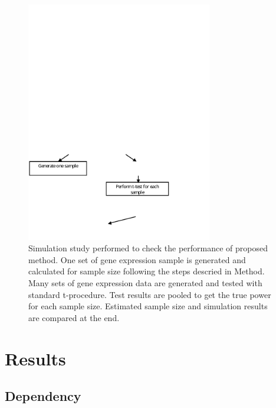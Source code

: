 \documentclass{bioinfo}
\begin{document}
\begin{figure}[h]
  \centerline{\includegraphics*[width=3.2in]{SimuFC.pdf}}
  \caption[Flow Chart for Simulation Study]
   {Simulation study performed to check the performance of proposed method.
    One set of gene expression sample is generated and calculated
    for sample size following the steps descried in Method. Many
    sets of gene expression data are generated and tested with
    standard t-procedure. Test results are pooled to get the true
    power for each sample size. Estimated sample size and simulation
    results are compared at the end.}
  \label{fig:SimuFC}
\end{figure}

\section{Results}

\subsection{Dependency}
\end{document}

